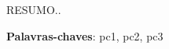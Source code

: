 \begin{resumo}
 RESUMO..

 \vspace{\onelineskip}
    
 \noindent
 \textbf{Palavras-chaves}: pc1, pc2, pc3
\end{resumo}